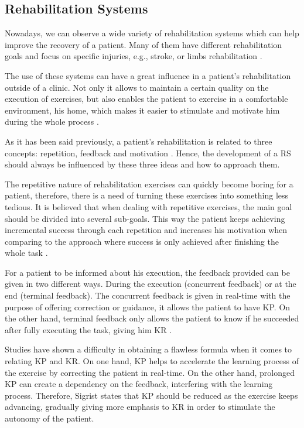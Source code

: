 \documentclass[runningheads]{llncs}
\begin{document}
\subsection{Rehabilitation Systems}

Nowadays, we can observe a wide variety of rehabilitation systems which can help improve the recovery of a patient. 
Many of them have different rehabilitation goals and focus on specific injuries, e.g., stroke\cite{Borghese2013, Design2005}, 
or limbs rehabilitation \cite{Sadihov2013,Burke2009, Klein2013}.

The use of these systems can have a great influence in a patient's rehabilitation outside of a clinic. 
Not only it allows to maintain a certain quality on the execution of exercises, but also enables 
the patient to exercise in a comfortable environment, his home, which makes it easier to stimulate 
and motivate him during the whole process \cite{Borghese2013}.

As it has been said previously, a patient's rehabilitation is related to three concepts: repetition, feedback and motivation \cite{Schonauer2011a}. 
Hence, the development of a \ac{RS} should always be influenced by these three ideas and how to approach them. 

The repetitive nature of rehabilitation exercises can quickly become boring for a patient\cite{Rego2010, Burke2009, Burdea2002}, 
therefore, there is a need of turning these exercises into something less tedious. 
It is believed that when dealing with repetitive exercises, the main goal should be divided into several sub-goals. This way the 
patient keeps achieving incremental success through each repetition and increases his motivation when comparing to the approach where success is only achieved after finishing the whole task \cite{Schonauer2011a}.

For a patient to be informed about his execution, the feedback provided can be given in two different ways. During the execution
(concurrent feedback) or at the end (terminal feedback)\cite{Sigrist2013}.
The concurrent feedback is given in real-time with the purpose of offering correction or guidance, 
it allows the patient to have \ac{KP}. On the other hand, terminal feedback only allows the patient 
to know if he succeeded after fully executing the task, giving him \ac{KR} \cite{Design2005, Schonauer2011a}. 

Studies have shown a difficulty in obtaining a flawless formula when it comes to relating \ac{KP} and \ac{KR}. 
On one hand, \ac{KP} helps to accelerate the learning process of the exercise by correcting the patient in
real-time. On the other hand, prolonged \ac{KP} can create a dependency on the feedback, interfering with the 
learning process. Therefore, Sigrist \cite{Sigrist2013} states that \ac{KP} should be reduced as the exercise
keeps advancing, gradually giving more emphasis to \ac{KR} in order to stimulate the autonomy of the patient.
\end{document}
